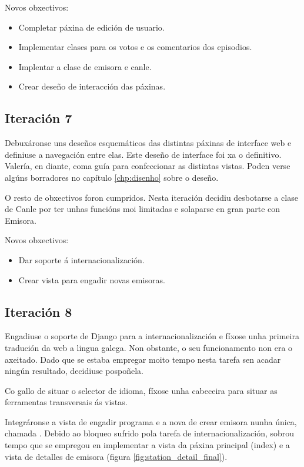 Novos obxectivos:
\begin{itemize}
	\item Completar páxina de edición de usuario.
	\item Implementar clases para os votos e os comentarios dos episodios.
	\item Implentar a clase de emisora e canle.
	\item Crear deseño de interacción das páxinas.
\end{itemize}

\subsection{Iteración 7}

Debuxáronse uns deseños esquemáticos das distintas páxinas de interface web e definiuse a navegación entre elas. Este deseño de interface foi xa o definitivo. Valería, en diante, coma guía para confeccionar as distintas vistas. Poden verse algúns borradores no capítulo \ref{chp:disenho} sobre o deseño.

O resto de obxectivos foron cumpridos. Nesta iteración decidiu desbotarse a clase de Canle por ter unhas funcións moi limitadas e solaparse en gran parte con Emisora.

Novos obxectivos:
\begin{itemize}
	\item Dar soporte á internacionalización.
	\item Crear vista para engadir novas emisoras.
\end{itemize}


\subsection{Iteración 8}

Engadiuse o soporte de Django para a internacionalización e fíxose unha primeira tradución da web a lingua galega. Non obstante, o seu funcionamento non era o axeitado. Dado que se estaba empregar moito tempo nesta tarefa sen acadar ningún resultado, decidiuse pospoñela.

Co gallo de situar o selector de idioma, fíxose unha cabeceira para situar as ferramentas transversais ás vistas.

Integráronse a vista de engadir programa e a nova de crear emisora nunha única, chamada . Debido ao bloqueo sufrido pola tarefa de internacionalización, sobrou tempo que se empregou en implementar a vista da páxina principal (index) e a vista de detalles de emisora (figura \ref{fig:station_detail_final}).

